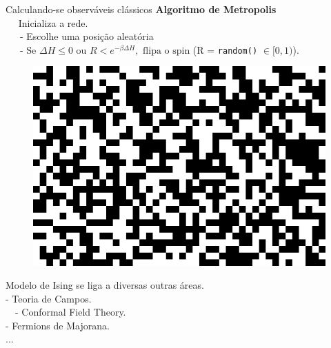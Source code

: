 \documentclass[10pt]{beamer}
\begin{document}
\begin{frame}{Calculando-se observáveis clássicos}
	\textbf{Algoritmo de Metropolis} \\
	
	\ \ \- Inicializa a rede. \\
	\ \ \ - Escolhe uma posição aleatória \\
	\ \ \ - $\text{Se } \Delta H \leq 0 \text{ ou } R < e^{-\beta \Delta H}, \text{ flipa o spin} $ (R = \texttt{random()} $\in [0, 1)$).
	\begin{figure}[h]
		\center
		\includegraphics[scale=.2]{initLattice.png}	
	\end{figure}

\end{frame}





\begin{frame}
	Modelo de Ising se liga a diversas outras áreas. \\
	- Teoria de Campos. \\
	 \ \ - Conformal Field Theory. \\
	- Fermions de Majorana. \\
	...
\end{frame}
\end{document}

